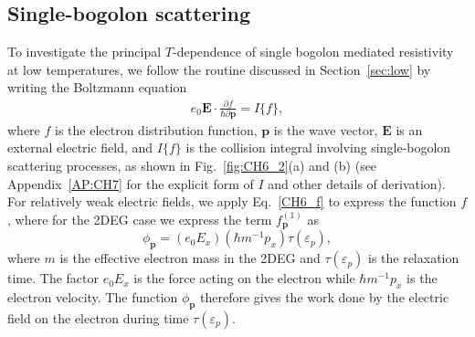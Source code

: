 \subsection{Single-bogolon scattering}
To investigate the principal $T$-dependence of single bogolon mediated resistivity at low temperatures, we follow the routine discussed in Section~\ref{sec:low} by writing the Boltzmann equation
%
\begin{eqnarray}
\label{CH7_Eq1}
e_0\textbf{E}\cdot\frac{\partial f}{\hbar\partial \textbf{p}}=I\{f\},
\end{eqnarray}
%
where $f$ is the electron distribution function, $\mathbf{p}$ is the wave vector, $\mathbf{E}$ is an external electric field, and $I\{f\}$ is the collision integral involving single-bogolon scattering processes, as shown in Fig.~\ref{fig:CH6_2}(a) and (b) (see Appendix~\ref{AP:CH7} for the explicit form of $I$ and other details of derivation).
For relatively weak electric fields, we apply Eq.~\ref{CH6_f} to express the function $f$,
%
%
%
where for the 2DEG case we express the term $f^{\left(1\right)}_\mathbf{p}$ as
\begin{equation}
\label{CH7_EqAnsatz}
\phi_\textbf{p}= (e_0E_x)(\hbar m^{-1}p_x)\tau(\varepsilon_p),
\end{equation}
%
where $m$ is the effective electron mass in the 2DEG and $\tau(\varepsilon_p)$ is the relaxation time.
The factor $e_0E_x$ is the force acting on the electron while $\hbar m^{-1}p_x$ is the electron velocity.
The function $\phi_\mathbf{p}$ therefore gives the work done by the electric field on the electron during time $\tau(\varepsilon_p)$.

